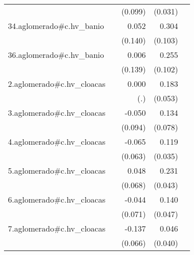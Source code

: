 {\begin{longtable}{l*{4}{D{.}{.}{-1}}}
            &                     &     (0.099)         &     (0.031)         &                     \\
\addlinespace
34.aglomerado#c.hv\_banio&                     &       0.052         &       0.304\sym{**} &                     \\
            &                     &     (0.140)         &     (0.103)         &                     \\
\addlinespace
36.aglomerado#c.hv\_banio&                     &       0.006         &       0.255\sym{*}  &                     \\
            &                     &     (0.139)         &     (0.102)         &                     \\
\addlinespace
2.aglomerado#c.hv\_cloacas&                     &       0.000         &       0.183\sym{***}&                     \\
            &                     &         (.)         &     (0.053)         &                     \\
\addlinespace
3.aglomerado#c.hv\_cloacas&                     &      -0.050         &       0.134         &                     \\
            &                     &     (0.094)         &     (0.078)         &                     \\
\addlinespace
4.aglomerado#c.hv\_cloacas&                     &      -0.065         &       0.119\sym{***}&                     \\
            &                     &     (0.063)         &     (0.035)         &                     \\
\addlinespace
5.aglomerado#c.hv\_cloacas&                     &       0.048         &       0.231\sym{***}&                     \\
            &                     &     (0.068)         &     (0.043)         &                     \\
\addlinespace
6.aglomerado#c.hv\_cloacas&                     &      -0.044         &       0.140\sym{**} &                     \\
            &                     &     (0.071)         &     (0.047)         &                     \\
\addlinespace
7.aglomerado#c.hv\_cloacas&                     &      -0.137\sym{*}  &       0.046         &                     \\
            &                     &     (0.066)         &     (0.040)         &                     \\

\end{longtable}}
